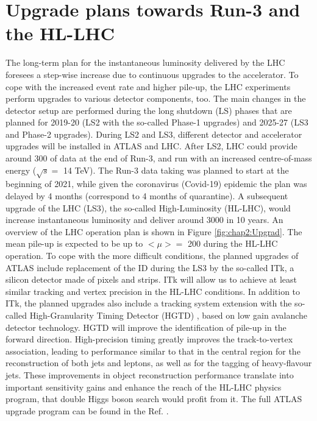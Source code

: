\section{Upgrade plans towards Run-3 and the HL-LHC}
\label{chap2:Upgrad}
The long-term plan for the instantaneous luminosity delivered by the LHC foresees a step-wise increase due to continuous upgrades to the accelerator. To cope with the increased event rate and higher pile-up, the LHC experiments perform upgrades to various detector components, too. The main changes in the detector setup are performed during the long shutdown (LS) phases that are planned for 2019-20 (LS2 with the so-called Phase-1 upgrades) and 2025-27 (LS3 and Phase-2 upgrades). During LS2 and LS3, different detector and accelerator upgrades will be installed in ATLAS and LHC. After LS2, LHC could provide around 300 \ifb of data at the end of Run-3, and run with an increased centre-of-mass energy ($\sqrt{s} = $ 14 TeV). The Run-3 data taking was planned to start at the beginning of 2021, while given the coronavirus (Covid-19) epidemic the plan was delayed by 4 months (correspond to 4 months of quarantine).  A subsequent upgrade of the LHC (LS3), the so-called High-Luminosity (HL-LHC), would increase instantaneous luminosity and deliver around 3000 \ifb in 10 years.  An overview of the LHC operation plan is shown in Figure \ref{fig:chap2:Upgrad}. The mean pile-up is expected to be up to  $<\mu> = $ 200 during the HL-LHC operation. To cope with the more difficult conditions, the planned upgrades of ATLAS include replacement of the ID during the LS3 by the so-called ITk, a silicon detector made of pixels and strips. ITk will allow us to achieve at least similar tracking and vertex precision in the HL-LHC conditions. In addition to ITk, the planned upgrades also include a tracking system extension with the so-called High-Granularity Timing Detector (HGTD) \cite{HGTD}, based on low gain avalanche detector technology. HGTD will improve the identification of pile-up in the forward direction.  High-precision timing greatly improves the track-to-vertex association, leading to performance similar to that in the central region for the reconstruction of both jets and leptons, as well as for the tagging of heavy-flavour jets. These improvements in object reconstruction performance translate into important sensitivity gains and enhance the reach of the HL-LHC physics program, that double Higgs boson search would profit from it. The full ATLAS upgrade program can be found in the Ref. \cite{CERN-LHCC-2015-020, CERN-LHCC-2017-021, CERN-LHCC-2017-020, CERN-LHCC-2017-005, CERN-LHCC-2017-017, CERN-LHCC-2017-018, CERN-LHCC-2017-019}.

